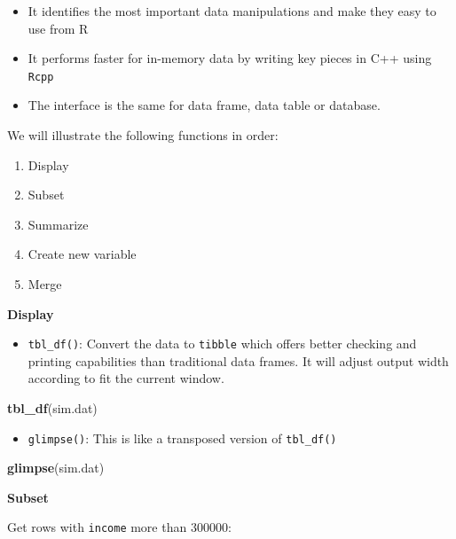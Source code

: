 \documentclass[12pt,]{krantz}
\makeatletter
\newenvironment{Shaded}{\begin{snugshade}}{\end{snugshade}}
\newcommand{\KeywordTok}[1]{\textcolor[rgb]{0.27,0.27,0.27}{\textbf{#1}}}
\newcommand{\NormalTok}[1]{#1}
\providecommand{\tightlist}{%
  \setlength{\itemsep}{0pt}\setlength{\parskip}{0pt}}
\newenvironment{kframe}{%
\medskip{}
\setlength{\fboxsep}{.8em}
 \def\at@end@of@kframe{}%
 \ifinner\ifhmode%
  \def\at@end@of@kframe{\end{minipage}}%
  \begin{minipage}{\columnwidth}%
 \fi\fi%
 \def\FrameCommand##1{\hskip\@totalleftmargin \hskip-\fboxsep
 \colorbox{shadecolor}{##1}\hskip-\fboxsep
     \hskip-\linewidth \hskip-\@totalleftmargin \hskip\columnwidth}%
 \MakeFramed {\advance\hsize-\width
   \@totalleftmargin\z@ \linewidth\hsize
   \@setminipage}}%
 {\par\unskip\endMakeFramed%
 \at@end@of@kframe}
\renewenvironment{Shaded}{\begin{kframe}}{\end{kframe}}
\makeatother
\begin{document}
\begin{itemize}
\tightlist
\item
  It identifies the most important data manipulations and make they easy to use from R
\item
  It performs faster for in-memory data by writing key pieces in C++ using \texttt{Rcpp}
\item
  The interface is the same for data frame, data table or database.
\end{itemize}

We will illustrate the following functions in order:

\begin{enumerate}
\def\labelenumi{\arabic{enumi}.}
\tightlist
\item
  Display
\item
  Subset
\item
  Summarize
\item
  Create new variable
\item
  Merge
\end{enumerate}

\textbf{Display}

\begin{itemize}
\tightlist
\item
  \texttt{tbl\_df()}: Convert the data to \texttt{tibble} which offers better checking and printing capabilities than traditional data frames. It will adjust output width according to fit the current window.
\end{itemize}

\begin{Shaded}
\begin{Highlighting}[]
\KeywordTok{tbl_df}\NormalTok{(sim.dat)}
\end{Highlighting}
\end{Shaded}

\begin{itemize}
\tightlist
\item
  \texttt{glimpse()}: This is like a transposed version of \texttt{tbl\_df()}
\end{itemize}

\begin{Shaded}
\begin{Highlighting}[]
\KeywordTok{glimpse}\NormalTok{(sim.dat)}
\end{Highlighting}
\end{Shaded}

\textbf{Subset}

Get rows with \texttt{income} more than 300000:
\end{document}
